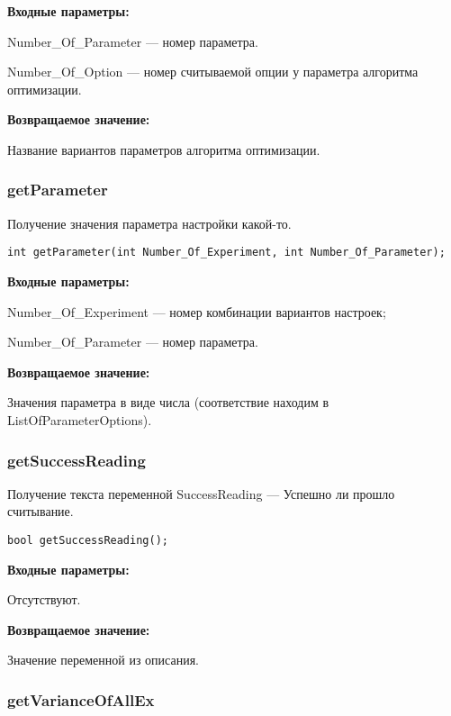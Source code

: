 \documentclass[a4paper,12pt]{article}
\begin{document}
\textbf{Входные параметры:}

Number\_Of\_Parameter --- номер параметра.
 
    Number\_Of\_Option --- номер считываемой опции у параметра алгоритма оптимизации.

\textbf{Возвращаемое значение:}

Название вариантов параметров алгоритма оптимизации.


\subsubsection{getParameter}\label{getParameter}

Получение значения параметра настройки какой-то.


\begin{lstlisting}[label=code_syntax_getParameter,caption=Синтаксис]
int getParameter(int Number_Of_Experiment, int Number_Of_Parameter);
\end{lstlisting}

\textbf{Входные параметры:}

Number\_Of\_Experiment --- номер комбинации вариантов настроек;
 
    Number\_Of\_Parameter --- номер параметра.

\textbf{Возвращаемое значение:}

Значения параметра в виде числа (соответствие находим в ListOfParameterOptions).


\subsubsection{getSuccessReading}\label{getSuccessReading}

Получение текста переменной SuccessReading --- Успешно ли прошло считывание.


\begin{lstlisting}[label=code_syntax_getSuccessReading,caption=Синтаксис]
bool getSuccessReading();
\end{lstlisting}

\textbf{Входные параметры:}

Отсутствуют.

\textbf{Возвращаемое значение:}

Значение переменной из описания.


\subsubsection{getVarianceOfAllEx}\label{getVarianceOfAllEx}
\end{document}
